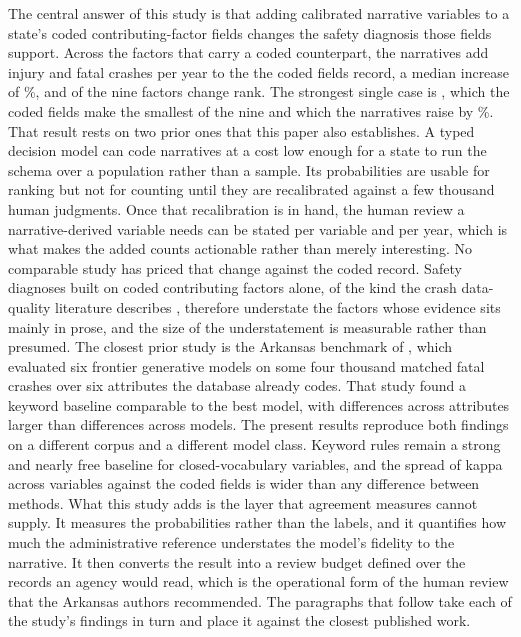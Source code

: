 The central answer of this study is that adding calibrated narrative variables to a state's
coded contributing-factor fields changes the safety diagnosis those fields support. Across the
\DownNVars{} factors that carry a coded counterpart, the narratives add \DownAddedTotal{}
injury and fatal crashes per year to the \DownCodedTotal{} the coded fields record, a median
increase of \DownRelMedian\%, and \DownNRankMove{} of the nine factors change rank. The
strongest single case is \DownRelMaxVar{}, which the coded fields make the smallest of the nine
and which the narratives raise by \DownRelMax\%. That result rests on two prior ones that this paper also establishes. A typed decision model
can code narratives at a cost low enough for a state to run the schema over a population rather
than a sample. Its probabilities are usable for ranking but not for counting until they are
recalibrated against a few thousand human judgments. Once that
recalibration is in hand, the human review a narrative-derived variable needs can be stated per
variable and per year, which is what makes the added counts actionable rather than merely
interesting. No comparable study has priced that change against the coded record. Safety
diagnoses built on coded contributing factors alone, of the kind the crash data-quality
literature describes \citep{imprialou2019quality}, therefore understate the factors whose
evidence sits mainly in prose, and the size of the understatement is measurable rather than
presumed. The closest prior study is the Arkansas
benchmark of \citet{bharati2026benchmarking}, which evaluated six frontier generative models
on some four thousand matched fatal crashes over six attributes the database already codes. That
study found a keyword baseline comparable to the best model, with differences across
attributes larger than differences across models. The present results reproduce both
findings on a different corpus and a different model class. Keyword rules remain a strong and
nearly free baseline for closed-vocabulary variables, and the spread of kappa across
variables against the coded fields is wider than any difference between methods. What this
study adds is the layer that agreement measures cannot supply. It measures the probabilities
rather than the labels, and it quantifies how much the administrative reference understates the
model's fidelity to the narrative. It then converts the result into a review budget defined over the records an agency
would read, which is the operational form of the human review that the Arkansas authors
recommended. The paragraphs that follow take each of the study's findings in turn and place
it against the closest published work.

